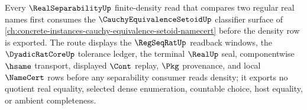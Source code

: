 Every $\RealSeparabilityUp$ finite-density read that compares two regular real names first consumes the $\CauchyEquivalenceSetoidUp$ classifier surface of \autoref{ch:concrete-instances-cauchy-equivalence-setoid-namecert} before the density row is exported. The route displays the $\RegSeqRatUp$ readback windows, the $\DyadicRatCoreUp$ tolerance ledger, the terminal $\RealUp$ seal, componentwise $\hsame$ transport, displayed $\Cont$ replay, $\Pkg$ provenance, and local $\NameCert$ rows before any separability consumer reads density; it exports no quotient real equality, selected dense enumeration, countable choice, host equality, or ambient completeness.
